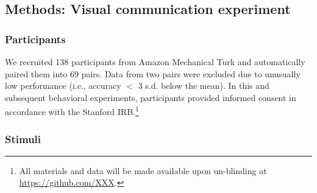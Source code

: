 \documentclass[10pt,letterpaper]{article}
\begin{document}


\subsection{Methods: Visual communication experiment}

\subsubsection{Participants} We recruited 138 participants from Amazon Mechanical Turk and automatically paired them into 69 pairs.
Data from two pairs were excluded due to unusually low performance (i.e., accuracy $<$ 3 s.d. below the mean).
In this and subsequent behavioral experiments, participants provided informed consent in accordance with the Stanford IRB.\footnote{All materials and data will be made available upon un-blinding at \url{https://github.com/XXX}.}

\subsubsection{Stimuli}
\end{document}
